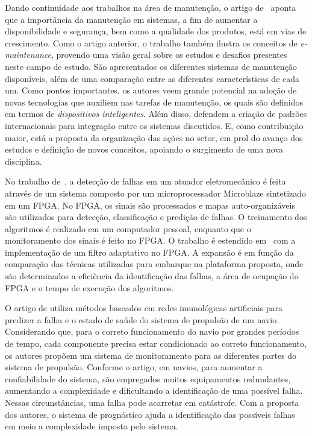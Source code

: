 Dando continuidade aos trabalhos na área de manutenção, o artigo de~\cite{muller2008concept} aponta
que a importância da manutenção em sistemas, a fim de aumentar a disponibilidade e segurança, bem
como a qualidade dos produtos, está em vias de crescimento. Como o artigo anterior, o trabalho
também ilustra os conceitos de \textit{e-maintenance}, provendo uma visão geral sobre os estudos e
desafios presentes neste campo de estudo. São apresentados os diferentes sistemas de manutenção
disponíveis, além de uma comparação entre as diferentes características de cada um. Como pontos
importantes, os autores veem grande potencial na adoção de novas tecnologias que auxiliem nas
tarefas de manutenção, os quais são definidos em termos de \emph{dispositivos inteligentes}. Além
disso, defendem a criação de padrões internacionais para integração entre os sistemas discutidos. E,
como contribuição maior, está a proposta da organização das ações no setor, em prol do avanço dos
estudos e definição de novos conceitos, apoiando o surgimento de uma nova disciplina.

No trabalho de~\cite{goncalves2009design}, a detecção de falhas em um atuador eletromecânico é feita
através de um sistema composto por um microprocessador Microblaze sintetizado em um \gls{FPGA}. No
\gls{FPGA}, os sinais são processados e mapas auto-organizáveis são utilizados para detecção,
classificação e predição de falhas. O treinamento dos algoritmos é realizado em um computador
pessoal, enquanto que o monitoramento dos sinais é feito no \gls{FPGA}. O trabalho é estendido
em~\cite{goncalves2011desenvolvimento} com a implementação de um filtro adaptativo no \gls{FPGA}. A
expansão é em função da comparação das técnicas utilizadas para embarque na plataforma proposta,
onde são determinados a eficiência da identificação das falhas, a área de ocupação do \gls{FPGA} e o
tempo de execução dos algoritmos.

O artigo de \cite{hu2012prognostic} utiliza métodos baseados em redes imunológicas artificiais para
predizer a falha e o estado de saúde do sistema de propulsão de um navio. Considerando que, para o
correto funcionamento do navio por grandes períodos de tempo, cada componente precisa estar
condicionado ao correto funcionamento, os autores propõem um sistema de monitoramento para as
diferentes partes do sistema de propulsão. Conforme o artigo, em navios, para aumentar a
confiabilidade do sistema, são empregados muitos equipamentos redundantes, aumentando a complexidade
e dificultando a identificação de uma possível falha. Nessas circunstâncias, uma falha pode
acarretar em catástrofe. Com a proposta dos autores, o sistema de prognóstico ajuda a identificação
das possíveis falhas em meio a complexidade imposta pelo sistema.

